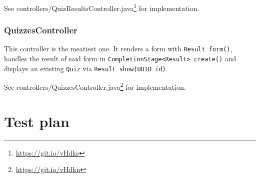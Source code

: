 \documentclass[english,a4paper,]{report}
\renewcommand{\href}[2]{#2\footnote{\url{#1}}}
\begin{document}
See \href{https://git.io/vHdks}{controllers/QuizResultsController.java}
for implementation.

\subsection{QuizzesController}\label{quizzescontroller}

This controller is the meatiest one. It renders a form with
\texttt{Result\ form()}, handles the result of said form in
\texttt{CompletionStage\textless{}Result\textgreater{}\ create()} and
displays an existing \texttt{Quiz} via \texttt{Result\ show(UUID\ id)}.

See \href{https://git.io/vHdkn}{controllers/QuizzesController.java} for
implementation.

\chapter{Test plan}\label{test-plan}
\end{document}
